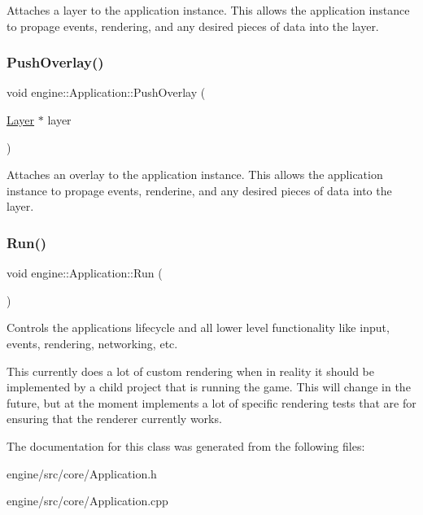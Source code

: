 Attaches a layer to the application instance. This allows the application instance to propage events, rendering, and any desired pieces of data into the layer. \mbox{\label{classengine_1_1Application_a00041c455b5699665d21662be95abd85}} 
\subsubsection{\texorpdfstring{Push\+Overlay()}{PushOverlay()}}
{\footnotesize\ttfamily void engine\+::\+Application\+::\+Push\+Overlay (\begin{DoxyParamCaption}\item[{\hyperlink{classengine_1_1Layer}{Layer} $\ast$}]{layer }\end{DoxyParamCaption})}

Attaches an overlay to the application instance. This allows the application instance to propage events, renderine, and any desired pieces of data into the layer. \mbox{\label{classengine_1_1Application_a4dcdf08d920f7f63013a25cb1e80438b}} 
\subsubsection{\texorpdfstring{Run()}{Run()}}
{\footnotesize\ttfamily void engine\+::\+Application\+::\+Run (\begin{DoxyParamCaption}{ }\end{DoxyParamCaption})}

Controls the applications lifecycle and all lower level functionality like input, events, rendering, networking, etc.

This currently does a lot of custom rendering when in reality it should be implemented by a child project that is running the game. This will change in the future, but at the moment implements a lot of specific rendering tests that are for ensuring that the renderer currently works. 

The documentation for this class was generated from the following files\+:\begin{DoxyCompactItemize}
\item 
engine/src/core/Application.\+h\item 
engine/src/core/Application.\+cpp\end{DoxyCompactItemize}
